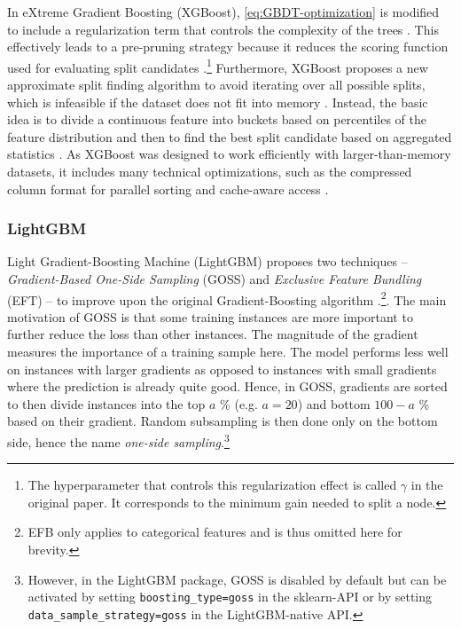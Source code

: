 In eXtreme Gradient Boosting (XGBoost), \cref{eq:GBDT-optimization} is modified to include a regularization term that controls the complexity of the trees \parencite[2]{chen_xgboost_2016}. This effectively leads to a pre-pruning strategy because it reduces the scoring function used for evaluating split candidates \parencites[1941--1942]{bentejac_comparative_2021}.\footnote{The hyperparameter that controls this regularization effect is called $\gamma$ in the original paper. It corresponds to the minimum gain needed to split a node.}
Furthermore, XGBoost proposes a new approximate split finding algorithm to avoid iterating over all possible splits, which is infeasible if the dataset does not fit into memory \parencite[Chapter~3]{chen_xgboost_2016}. Instead, the basic idea is to divide a continuous feature into buckets based on percentiles of the feature distribution and then to find the best split candidate based on aggregated statistics \parencite[Chapter~3.2]{chen_xgboost_2016}.
As XGBoost was designed to work efficiently with larger-than-memory datasets, it includes many technical optimizations, such as the compressed column format for parallel sorting and cache-aware access \parencite[Chapter~4]{chen_xgboost_2016}.

\subsubsection{LightGBM}

Light Gradient-Boosting Machine (LightGBM) proposes two techniques -- \textit{Gradient-Based One-Side Sampling} (GOSS) and \textit{Exclusive Feature Bundling} (EFT) -- to improve upon the original Gradient-Boosting algorithm \parencite[1]{ke_lightgbm_2017}.\footnote{EFB only applies to categorical features and is thus omitted here for brevity.}. The main motivation of GOSS is that some training instances are more important to further reduce the loss than other instances. The magnitude of the gradient measures the importance of a training sample here. The model performs less well on instances with larger gradients as opposed to instances with small gradients where the prediction is already quite good. Hence, in GOSS, gradients are sorted to then divide instances into the top $a$ \% (e.g. $a=20$) and bottom $100 - a$ \% based on their gradient. Random subsampling is then done only on the bottom side, hence the name \textit{one-side sampling}.\footnote{However, in the LightGBM package, GOSS is disabled by default but can be activated by setting \texttt{boosting\_type=goss} in the sklearn-API or by setting \texttt{data\_sample\_strategy=goss} in the LightGBM-native API.}

